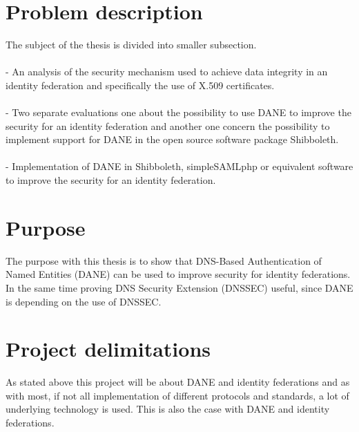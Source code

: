 
\section{Problem description}
The subject of the thesis is divided into smaller subsection. 
\\\\
- An analysis of the security mechanism used to achieve data integrity in an identity federation and specifically the use of X.509 certificates.
\\\\
- Two separate evaluations one about the possibility to use DANE to improve the security for an identity federation
and another one concern the possibility to implement support for DANE in the open source software package Shibboleth.
\\\\
- Implementation of DANE in Shibboleth, simpleSAMLphp or equivalent software to improve the security for an identity federation.


\section{Purpose}
The purpose with this thesis is to show that DNS-Based Authentication of Named Entities (DANE) \cite{rfc:6394,rfc:draft-dane,rfc:draft-smime} can be used to improve security for identity federations.
In the same time proving DNS Security Extension (DNSSEC) \cite{rfc:4033,rfc:4034,rfc:4035,rfc:5011} useful, since DANE is 
depending on the use of DNSSEC.

\section{Project delimitations}
As stated above this project will be about DANE and identity federations and as with most, if not all implementation of different protocols and standards, a lot of underlying technology is used.
This is also the case with DANE and identity federations.

